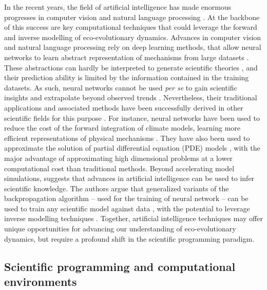 \label{subsec:artificial intelligence}
In the recent years, the field of artificial intelligence has made enormous progresses in computer vision \citep{voulodimos2018deep} and natural language processing \citep{young2018recent}. At the backbone of this success are key computational techniques that could leverage the forward and inverse modelling of eco-evolutionary dynamics.
% 
Advances in computer vision and natural language processing rely on deep learning methods, that allow neural networks to learn abstract representation of mechanisms from large datasets \citep{LeCun2015}.
% 
These abstractions can hardly be interpreted to generate scientific theories \citep{Karpatne2017}, and their prediction ability is limited by the information contained in the training datasets. As such, neural networks cannot be used \textit{per se} to gain scientific insights and extrapolate beyond observed trends \citep{Barnosky2012,Urban2016}.
% 
Nevertheless, their traditional applications and associated methods have been successfully derived in other scientific fields for this purpose \citep{Kashinath2021,Schneider2017,Yazdani2020,Rolnick2023}.
%
For instance, neural networks have been used to reduce the cost of the forward integration of climate models, learning more efficient representations of physical mechanisms \citep{Kashinath2021}.
% 
They have also been used to approximate the solution of partial differential equation (PDE) models \citep{Sirignano2018dgm,Han2018}, with the major advantage of approximating high dimensional problems at a lower computational cost than traditional methods.
% 
Beyond accelerating model simulations, \cite{Rackauckas2020a} suggests that advances in artificial intelligence can be used to infer scientific knowledge. The authors argue that generalized variants of the backpropagation algorithm -- used for the training of neural network \citep{LeCun2015}-- can be used to train any scientific model against data \citep{Rackauckas2020}, with the potential to leverage inverse modelling techniques \citep{Frank2022}. 
% 
Together, artificial intelligence techniques may offer unique opportunities for advancing our understanding of eco-evolutionary dynamics, but require a profound shift in the scientific programming paradigm.


\subsection{Scientific programming and computational environments}

